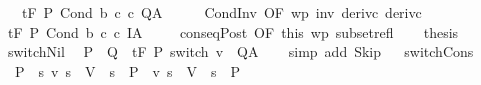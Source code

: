 \begin{isabellebody}
\ \ \ {\isachardoublequoteopen}{\isasymGamma}{\isacharcomma}{\isasymTheta}{\isasymturnstile}\isactrlsub t\isactrlbsub {\isacharslash}F\isactrlesub \ P\ {\isacharparenleft}Cond\ b\ c\ c\ Q{\isacharcomma}A{\isachardoublequoteclose}\isanewline
%
\isadelimproof
%
\endisadelimproof
%
\isatagproof
{}\isamarkupfalse%
\ {\isacharminus}\isanewline
\ \ \isamarkupfalse%
\ CondInv\ {\isacharbrackleft}OF\ wp\ inv\ deriv{\isacharunderscore}c{}\ deriv{\isacharunderscore}c{}{\isacharbrackright}\isanewline
\ \ \isamarkupfalse%
\ {\isachardoublequoteopen}{\isasymGamma}{\isacharcomma}{\isasymTheta}{\isasymturnstile}\isactrlsub t\isactrlbsub {\isacharslash}F\isactrlesub \ P\ {\isacharparenleft}Cond\ b\ c\ c\ I{\isacharcomma}A{\isachardoublequoteclose}\ \isacommand{{\isachardot}}\isamarkupfalse%
\isanewline
\ \ \isamarkupfalse%
\ conseqPost\ {\isacharbrackleft}OF\ this\ wp{\isacharprime}\ subset{\isacharunderscore}refl{\isacharbrackright}\isanewline
\ \ \isamarkupfalse%
\ {\isacharquery}thesis\ \isacommand{{\isachardot}}\isamarkupfalse%
\isanewline
{}\isamarkupfalse%
%
\endisatagproof
{\isafoldproof}%
%
\isadelimproof
\isanewline
%
\endisadelimproof
\isanewline
\isanewline
{}\isamarkupfalse%
\ switchNil{\isacharcolon}\isanewline
\ \ {\isachardoublequoteopen}P\ {\isasymsubseteq}\ Q\ {\isasymLongrightarrow}\ {\isasymGamma}{\isacharcomma}{\isasymTheta}{\isasymturnstile}\isactrlsub t\isactrlbsub {\isacharslash}F\ \isactrlesub P\ {\isacharparenleft}switch\ v\ {\isacharbrackleft}{\isacharbrackright}{\isacharparenright}\ Q{\isacharcomma}A{\isachardoublequoteclose}\isanewline
%
\isadelimproof
\ \ %
\endisadelimproof
%
\isatagproof
{}\isamarkupfalse%
\ {\isacharparenleft}simp\ add{\isacharcolon}\ Skip{\isacharparenright}%
\endisatagproof
{\isafoldproof}%
%
\isadelimproof
\isanewline
%
\endisadelimproof
\ \isanewline
{}\isamarkupfalse%
\ switchCons{\isacharcolon}\isanewline
\ \ {\isachardoublequoteopen}{\isasymlbrakk}P\ {\isasymsubseteq}\ {\isacharbraceleft}s{\isachardot}\ {\isacharparenleft}v\ s\ {\isasymin}\ V\ {\isasymlongrightarrow}\ s\ {\isasymin}\ P\ {\isasymand}\ {\isacharparenleft}v\ s\ {\isasymnotin}\ V\ {\isasymlongrightarrow}\ s\ {\isasymin}\ P\ \isanewline

\end{isabellebody}
